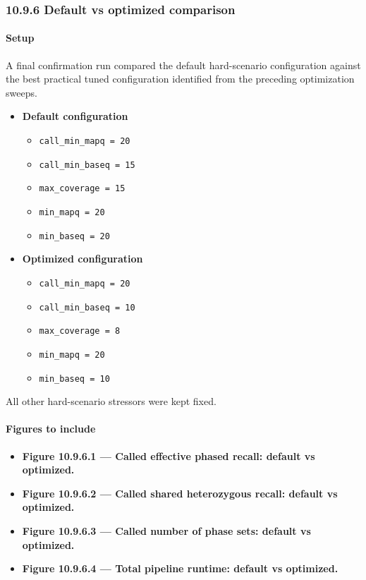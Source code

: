 \documentclass[
]{article}
\providecommand{\tightlist}{%
  \setlength{\itemsep}{0pt}\setlength{\parskip}{0pt}}
\begin{document}
\subsubsection{10.9.6 Default vs optimized
comparison}\label{default-vs-optimized-comparison}

\paragraph{Setup}\label{setup-12}

A final confirmation run compared the default hard-scenario
configuration against the best practical tuned configuration identified
from the preceding optimization sweeps.

\begin{itemize}
\tightlist
\item
  \textbf{Default configuration}

  \begin{itemize}
  \tightlist
  \item
    \texttt{call\_min\_mapq\ =\ 20}
  \item
    \texttt{call\_min\_baseq\ =\ 15}
  \item
    \texttt{max\_coverage\ =\ 15}
  \item
    \texttt{min\_mapq\ =\ 20}
  \item
    \texttt{min\_baseq\ =\ 20}
  \end{itemize}
\item
  \textbf{Optimized configuration}

  \begin{itemize}
  \tightlist
  \item
    \texttt{call\_min\_mapq\ =\ 20}
  \item
    \texttt{call\_min\_baseq\ =\ 10}
  \item
    \texttt{max\_coverage\ =\ 8}
  \item
    \texttt{min\_mapq\ =\ 20}
  \item
    \texttt{min\_baseq\ =\ 10}
  \end{itemize}
\end{itemize}

All other hard-scenario stressors were kept fixed.

\paragraph{Figures to include}\label{figures-to-include-12}

\begin{itemize}
\tightlist
\item
  \textbf{Figure 10.9.6.1 --- Called effective phased recall: default vs
  optimized.}
\item
  \textbf{Figure 10.9.6.2 --- Called shared heterozygous recall: default
  vs optimized.}
\item
  \textbf{Figure 10.9.6.3 --- Called number of phase sets: default vs
  optimized.}
\item
  \textbf{Figure 10.9.6.4 --- Total pipeline runtime: default vs
  optimized.}
\end{itemize}
\end{document}
